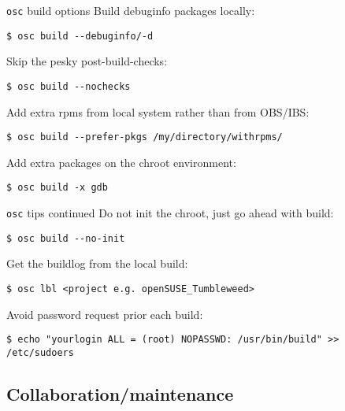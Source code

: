 \documentclass{beamer}
\begin{document}
\begin{frame}[fragile]{\texttt{osc} build options}
Build debuginfo packages locally:
\begin{small}
\begin{verbatim}$ osc build --debuginfo/-d\end{verbatim}
\end{small}
Skip the pesky post-build-checks:
\begin{small}
\begin{verbatim}$ osc build --nochecks\end{verbatim}
\end{small}
Add extra rpms from local system rather than from OBS/IBS:
\begin{small}
\begin{verbatim}$ osc build --prefer-pkgs /my/directory/withrpms/\end{verbatim}
\end{small}
Add extra packages on the chroot environment:
\begin{small}
\begin{verbatim}$ osc build -x gdb\end{verbatim}
\end{small}
\end{frame}

\begin{frame}[fragile]{\texttt{osc} tips continued}
Do not init the chroot, just go ahead with build:
\begin{small}
\begin{verbatim}$ osc build --no-init\end{verbatim}
\end{small}
Get the buildlog from the local build:
\begin{small}
\begin{verbatim}$ osc lbl <project e.g. openSUSE_Tumbleweed>\end{verbatim}
\end{small}
Avoid password request prior each build:
\begin{scriptsize}
\begin{verbatim}$ echo "yourlogin ALL = (root) NOPASSWD: /usr/bin/build" >> /etc/sudoers\end{verbatim}
\end{scriptsize}
\end{frame}

\subsection{Collaboration/maintenance}
\end{document}
